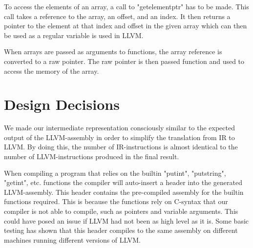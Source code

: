 To access the elements of an array, a call to "getelementptr" has to be made. This call takes a reference to the array, an offset, and an index. It then returns a pointer to the element at that index and offset in the given array which can then be used as a regular variable is used in LLVM.

When arrays are passed as arguments to functions, the array reference is converted to a raw pointer. The raw pointer is then passed function and used to access the memory of the array.




\section{Design Decisions}

We made our intermediate representation consciously similar to the expected output of the LLVM-assembly in order to simplify the translation from IR to LLVM. By doing this, the number of IR-instructions is almost identical to the number of LLVM-instructions produced in the final result.

When compiling a program that relies on the builtin "putint", "putstring", "getint", etc. functions the compiler will auto-insert a header into the generated LLVM-assembly. This header contains the pre-compiled assembly for the builtin functions required. This is because the functions rely on C-syntax that our compiler is not able to compile, such as pointers and variable arguments. This could have posed an issue if LLVM had not been as high level as it is. Some basic testing has shown that this header compiles to the same assembly on different machines running different versions of LLVM.


